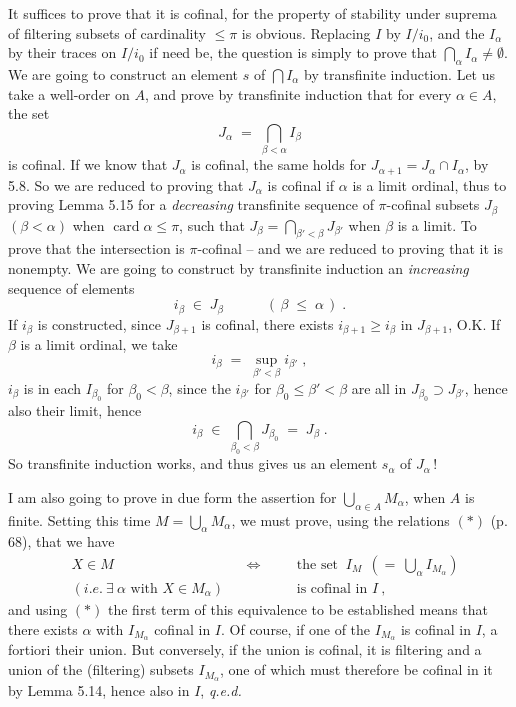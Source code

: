 \documentclass[11pt]{article}
\newcommand{\msp}[1]{\marginpar{\footnotesize [#1]}}
\newcommand{\card}{\operatorname{card}}
\begin{document}
It suffices to prove that it is cofinal, for the property of stability under suprema of filtering subsets of cardinality $\leq \pi$ is obvious. Replacing $I$ by $I/i_{0}$, and the $I_{\alpha}$ by their traces on $I/i_{0}$ if need be, the question is simply to prove that $\bigcap_{\alpha} I_{\alpha} \neq \emptyset$. We are going to construct an element $s$ of $\bigcap I_{\alpha}$ by transfinite induction. Let us take a well-order on $A$, and prove by transfinite induction
\msp{page 71}
that for every $\alpha \in A$, the set
\[
J_{\alpha} \;=\; \bigcap_{\beta<\alpha} I_{\beta}
\]
is cofinal. If we know that $J_{\alpha}$ is cofinal, the same holds for $J_{\alpha+1} = J_{\alpha} \cap I_{\alpha}$, by 5.8. So we are reduced to proving that $J_{\alpha}$ is cofinal if $\alpha$ is a limit ordinal, thus to proving Lemma 5.15 for a \textit{decreasing} transfinite sequence of $\pi$-cofinal subsets $J_{\beta}$ $(\beta < \alpha)$ when $\card \alpha \leq \pi$, such that $J_{\beta} = \bigcap_{\beta'<\beta} J_{\beta'}$ when $\beta$ is a limit. To prove that the intersection is $\pi$-cofinal -- and we are reduced to proving that it is nonempty. We are going to construct by transfinite induction an \textit{increasing} sequence of elements
\[
i_{\beta} \;\in\; J_{\beta} \qquad\quad (\, \beta \;\leq\; \alpha \,) \; .
\]
If $i_{\beta}$ is constructed, since $J_{\beta+1}$ is cofinal, there exists $i_{\beta+1} \geq i_{\beta}$ in $J_{\beta+1}$, O.K. If $\beta$ is a limit ordinal, we take
\[
i_{\beta} \;=\; \sup_{\beta'<\beta} i_{\beta'} \; ,
\]
$i_{\beta}$ is in each $I_{\beta_{0}}$ for $\beta_{0} < \beta$,
\msp{page 72}
since the $i_{\beta'}$ for $\beta_{0} \leq \beta' < \beta$ are all in $J_{\beta_{0}} \supset J_{\beta'}$, hence also their limit, hence
\[
i_{\beta} \;\in\; \bigcap_{\beta_{0}<\beta} J_{\beta_{0}} \;=\; J_{\beta} \; .
\]
So transfinite induction works, and thus gives us an element $s_{\alpha}$ of $J_{\alpha}$\,!

I am also going to prove in due form the assertion for $\bigcup_{\alpha\in A} M_{\alpha}$, when $A$ is finite. Setting this time $M = \bigcup_{\alpha} M_{\alpha}$, we must prove, using the relations $(*)$ (p. 68), that we have
\[
\begin{aligned}
&X \in M &&\Longleftrightarrow \quad &&\text{the set } \ I_{M} \ \ (= \ \textstyle\bigcup_{\alpha} I_{M_{\alpha}})\\
&(\textit{i.e.} \ \exists \ \alpha \text{ with } X \in M_{\alpha}) && &&\text{is cofinal in } I \ ,
\end{aligned}
\tag*{$(**)$}
\]
and using $(*)$ the first term of this equivalence to be established means that there exists $\alpha$ with $I_{M_{\alpha}}$ cofinal in $I$. Of course, if one of the $I_{M_{\alpha}}$ is cofinal in $I$, a fortiori their union. But conversely, if the union is cofinal, it is filtering and a union of the (filtering) subsets $I_{M_{\alpha}}$, one of which must therefore be cofinal in it by Lemma 5.14, hence also in $I$, \textit{q.e.d.}
\end{document}

